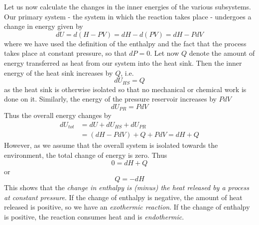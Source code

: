 \documentclass[a4paper, draft]{article}
\theoremstyle{own}
\theoremstyle{remark}
\begin{document}
Let us now calculate the changes in the inner energies of the various subsystems. Our primary system - the system in which the reaction takes place - undergoes a change in energy given by
$$
dU = d(H - PV) =  dH - d(PV) = dH - P dV
$$
where we have used the definition of the enthalpy and the fact that the process takes place at constant pressure, so that $dP = 0$. Let now $Q$ denote the amount of energy transferred as heat from our system into the heat sink. Then the inner energy of the heat sink increases by $Q$, i.e.
$$
dU_{HS} = Q
$$
as the heat sink is otherwise isolated so that no mechanical or chemical work is done on it. Similarly, the energy of the pressure reservoir increases by $P dV$
$$
dU_{PR} = P dV
$$
Thus the overall energy changes by
\begin{align*}
dU_{tot} &= dU + dU_{HS} + dU_{PR} \\
&= (dH - P dV) + Q + P dV = dH + Q
\end{align*}
However, as we assume that the overall system is isolated towards the environment, the total change of energy is zero. Thus
$$
0 = dH + Q
$$
or
$$
Q = - dH
$$ 
This shows that the {\em change in enthalpy is (minus) the heat released by a process at constant pressure}. If the change of enthalpy is negative, the amount of heat released is positive, so we have an {\em exothermic reaction}. If the change of enthalpy is positive, the reaction consumes heat and is {\em endothermic}.
\end{document}
